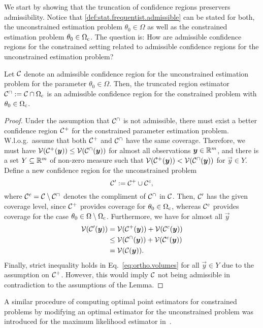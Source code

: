 We start by showing that the truncation of confidence regions preservers admissibility.
Notice that \cref{def:stat.frequentist.admissible} can be stated for both, the unconstrained estimation problem $\theta_0 \in \Omega$ as well as the constrained estimation problem $\theta_0 \in \Omega_{\mathrm{c}}$.
The question is: How are admissible confidence regions for the constrained setting related to admissible confidence regions for the unconstrained estimation problem?
\begin{lemma}\label{lem:ortho.admissible_truncation}
  Let $\mathcal{C}$ denote an admissible confidence region for the unconstrained estimation problem for the parameter $\theta_0 \in \Omega$.
  Then, the truncated region estimator $\mathcal{C}^\cap := \mathcal{C}\cap\Omega_{\mathrm{c}}$ is an admissible confidence region for the constrained problem with $\theta_0 \in \Omega_{\mathrm{c}}$.
\end{lemma}
\begin{proof}
  Under the assumption that $\mathcal{C}^\cap$ is not admissible, there must exist a better confidence region $\mathcal{C}^+$ for the constrained parameter estimation problem.
  W.l.o.g.\ assume that both $\mathcal{C}^+$ and $\mathcal{C}^\cap$ have the same coverage.
  Therefore, we must have $\mathcal{V}(\mathcal{C}^+({\boldsymbol{y}})) \leq \mathcal{V}(\mathcal{C}^\cap({\boldsymbol{y}}))$ for almost all observations ${\boldsymbol{y}} \in \mathbb{R}^m$, and there is a set $Y \subseteq \mathbb{R}^m$ of non-zero measure such that $\mathcal{V}(\mathcal{C}^+({\boldsymbol{y}})) < \mathcal{V}(\mathcal{C}^\cap({\boldsymbol{y}}))$ for $\vec y \in Y$.
  Define a new confidence region for the unconstrained problem
  \[
    \mathcal{C}' := \mathcal{C}^+ \cup \mathcal{C}^c,
    \label{eq:ortho.new_region}
  \]
  where $\mathcal{C}^{c}=\mathcal{C}\setminus \mathcal{C}^{\cap}$ denotes the compliment of $\mathcal{C}^{\cap}$ in $\mathcal{C}$.
  Then, $\mathcal{C}'$ has the given coverage level, since $\mathcal{C}^+$ provides coverage for $\theta_0 \in \Omega_{\mathrm{c}}$, whereas $\mathcal{C}^c$ provides coverage for the case $\theta_0 \in \Omega \setminus \Omega_{\mathrm{c}}$.
  Furthermore, we have for almost all $\vec y$
  \[
    \label{eq:ortho.volumes}
    \begin{split}
      \mathcal{V}(\mathcal{C}'({\boldsymbol{y}}))
      &= \mathcal{V}(\mathcal{C}^+({\boldsymbol{y}})) + \mathcal{V}(\mathcal{C}^c({\boldsymbol{y}})) \\
      &\leq \mathcal{V}(\mathcal{C}^\cap({\boldsymbol{y}})) + \mathcal{V}(\mathcal{C}^c({\boldsymbol{y}})) \\
      &= \mathcal{V}(\mathcal{C}({\boldsymbol{y}})).
    \end{split}
  \]
  Finally, strict inequality holds in Eq.~\eqref{eq:ortho.volumes} for all $\vec y \in Y$ due to the assumption on $\mathcal{C}^+$.
  However, this would imply $\mathcal{C}$ not being admissible in contradiction to the assumptions of the Lemma.
\end{proof}
A similar procedure of computing optimal point estimators for constrained problems by modifying an optimal estimator for the unconstrained problem was introduced for the maximum likelihood estimator in~\cite{Smolin_2012_Maximum}.\\



